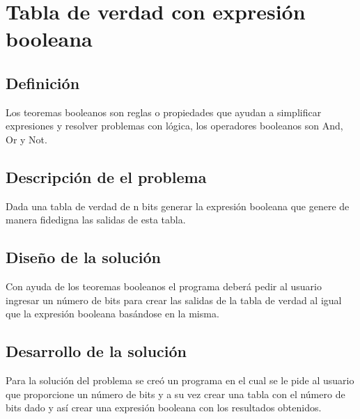 \section{Tabla de verdad con expresión booleana}

\subsection{Definición}
Los teoremas booleanos son reglas o propiedades que ayudan a simplificar expresiones y resolver problemas con lógica, los operadores booleanos son And, Or y Not. \cite{Boole}

\subsection{Descripción de el problema}
Dada una tabla de verdad de n bits generar la expresión booleana que genere de manera fidedigna las salidas de esta tabla.

\subsection{Diseño de la solución}
Con ayuda de los teoremas booleanos el programa deberá pedir al usuario ingresar un número de bits para crear las salidas de la tabla de verdad al igual que la expresión booleana basándose en la misma.


\subsection{Desarrollo de la solución}
Para la solución del problema se creó un programa en el cual se le pide al usuario que proporcione un número de bits y a su vez crear una tabla con el número de bits dado y así crear una expresión booleana con los resultados obtenidos.  


